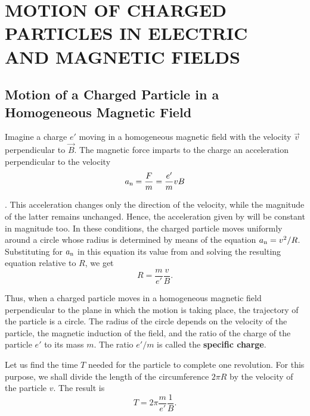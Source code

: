 

\chapter[MOTION OF CHARGED PARTICLES IN ELECTRIC\\
AND MAGNETIC FIELDS]{MOTION OF CHARGED \\PARTICLES IN ELECTRIC\\ AND MAGNETIC FIELDS}\label{chap:10}

\section{Motion of a Charged Particle in a Homogeneous Magnetic Field}\label{sec:10_1}

Imagine a charge $e'$ moving in a homogeneous magnetic field with the velocity $\vec{v}$ perpendicular to $\vec{B}$.
The magnetic force imparts to the charge an acceleration perpendicular to the velocity
\begin{equation}\label{eq:10_1}
    a_{\text{n}} = \frac{F}{m} = \frac{e'}{m} vB
\end{equation}

.
This acceleration changes only the direction of the velocity, while the magnitude of the latter remains unchanged.
Hence, the acceleration given by  will be constant in magnitude too.
In these conditions, the charged particle moves uniformly around a circle whose radius is determined by means of the equation $a_{\text{n}}=v^2/R$.
Substituting for $a_{\text{n}}$ in this equation its value from  and solving the resulting equation relative to $R$, we get
\begin{equation}\label{eq:10_2}
    R = \frac{m}{e'} \frac{v}{B}.
\end{equation}

Thus, when a charged particle moves in a homogeneous magnetic field perpendicular to the plane in which the motion is taking place, the trajectory of the particle is a circle.
The radius of the circle depends on the velocity of the particle, the magnetic induction of the field, and the ratio of the charge of the particle $e'$ to its mass $m$.
The ratio $e'/m$ is called the \textbf{specific charge}.

Let us find the time $T$ needed for the particle to complete one revolution.
For this purpose, we shall divide the length of the circumference $2\pi R$ by the velocity of the particle $v$. The result is
\begin{equation}\label{eq:10_3}
    T = 2\pi \frac{m}{e'} \frac{1}{B}.
\end{equation}

